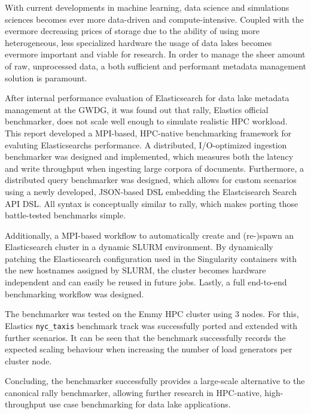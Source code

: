 With current developments in machine learning, data science and simulations sciences becomes ever more data-driven and compute-intensive. Coupled with the evermore decreasing prices of storage due to the ability of using more heterogeneous, less specialized hardware the usage of data lakes becomes evermore important and viable for research. In order to manage the sheer amount of raw, unprocessed data, a both sufficient and performant metadata management solution is paramount.

After internal performance evaluation of Elasticsearch for data lake metadata management at the GWDG, it was found out that rally, Elastics official benchmarker, does not scale well enough to simulate realistic \ac{HPC} workload. This report developed a \acs{MPI}-based, \acs{HPC}-native benchmarking framework for evaluting Elasticsearchs performance. A distributed, I/O-optimized ingestion benchmarker was designed and implemented, which measures both the latency and write throughput when ingesting large corpora of documents. Furthermore, a distributed query benchmarker was designed, which allows for custom scenarios using a newly developed, JSON-based DSL embedding the Elastcisearch Search API DSL. All syntax is conceptually similar to rally, which makes porting those battle-tested benchmarks simple.

Additionally, a \ac{MPI}-based workflow to automatically create and (re-)spawn an Elasticsearch cluster in a dynamic SLURM environment. By dynamically patching the Elasticsearch configuration used in the Singularity containers with the new hostnames assigned by SLURM, the cluster becomes hardware independent and can easily be reused in future jobs. Lastly, a full end-to-end benchmarking workflow was designed.

The benchmarker was tested on the Emmy \acs{HPC} cluster using 3 nodes. For this, Elastics \texttt{nyc\_taxis} benchmark track was successfully ported and extended with further scenarios. It can be seen that the benchmark successfully records the expected scaling behaviour when increasing the number of load generators per cluster node.

Concluding, the benchmarker successfully provides a large-scale alternative to the canonical rally benchmarker, allowing further research in \ac{HPC}-native, high-throughput use case benchmarking for data lake applications.
